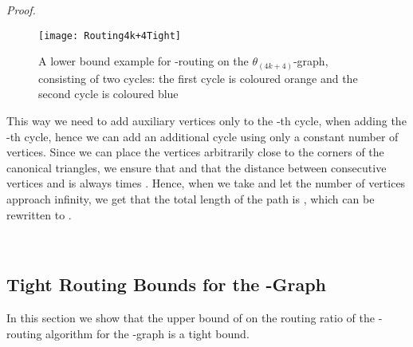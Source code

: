 \documentclass[12pt]{article}
\newenvironment{proof}{\emph{Proof.}}{\hfill \\}
\newcommand{\graph}[1]{\ensuremath{\theta_{(4 k + #1)}}-graph\xspace}
\begin{document}
\begin{proof}
  \begin{figure}[ht]
    \centering
    \texttt{[image: Routing4k+4Tight]}
    \caption{A lower bound example for -routing on the \graph{4}, consisting of two cycles: the first cycle is coloured orange and the second cycle is coloured blue}
    \label{fig:Routing4k+4Tight}
  \end{figure}

  This way we need to add auxiliary vertices only to the -th cycle, when adding the -th cycle, hence we can add an additional cycle using only a constant number of vertices. Since we can place the vertices arbitrarily close to the corners of the canonical triangles, we ensure that  and that the distance between consecutive vertices  and  is always  times . Hence, when we take  and let the number of vertices approach infinity, we get that the total length of the path is , which can be rewritten to .

\end{proof}


\subsection{Tight Routing Bounds for the -Graph}
In this section we show that the upper bound of  on the routing ratio of the -routing algorithm for the -graph is a tight bound. 
\end{document}

